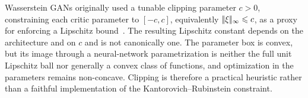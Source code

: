 \begin{rem}
	Wasserstein GANs originally used a tunable clipping parameter $c>0$, constraining each critic parameter to $[-c,c]$, equivalently $|\!| \xi |\!|_\infty\leqslant c$, as a proxy for enforcing a Lipschitz bound~\cite{WassersteinGAN}. The resulting Lipschitz constant depends on the architecture and on $c$ and is not canonically one. The parameter box is convex, but its image through a neural-network parametrization is neither the full unit Lipschitz ball nor generally a convex class of functions, and optimization in the parameters remains non-concave. Clipping is therefore a practical heuristic rather than a faithful implementation of the Kantorovich--Rubinstein constraint.
\end{rem}

